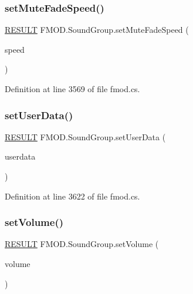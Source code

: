 \subsubsection{\texorpdfstring{set\+Mute\+Fade\+Speed()}{setMuteFadeSpeed()}}
{\footnotesize\ttfamily \hyperlink{namespace_f_m_o_d_a305d1176ef3f8c8815861a60407ac33d}{R\+E\+S\+U\+LT} F\+M\+O\+D.\+Sound\+Group.\+set\+Mute\+Fade\+Speed (\begin{DoxyParamCaption}\item[{float}]{speed }\end{DoxyParamCaption})}



Definition at line 3569 of file fmod.\+cs.

\mbox{\label{class_f_m_o_d_1_1_sound_group_ac73a1233539877dd44a467120e50735b}} 
\subsubsection{\texorpdfstring{set\+User\+Data()}{setUserData()}}
{\footnotesize\ttfamily \hyperlink{namespace_f_m_o_d_a305d1176ef3f8c8815861a60407ac33d}{R\+E\+S\+U\+LT} F\+M\+O\+D.\+Sound\+Group.\+set\+User\+Data (\begin{DoxyParamCaption}\item[{Int\+Ptr}]{userdata }\end{DoxyParamCaption})}



Definition at line 3622 of file fmod.\+cs.

\mbox{\label{class_f_m_o_d_1_1_sound_group_a9c5a0509676c6941fee8566f94aeff48}} 
\subsubsection{\texorpdfstring{set\+Volume()}{setVolume()}}
{\footnotesize\ttfamily \hyperlink{namespace_f_m_o_d_a305d1176ef3f8c8815861a60407ac33d}{R\+E\+S\+U\+LT} F\+M\+O\+D.\+Sound\+Group.\+set\+Volume (\begin{DoxyParamCaption}\item[{float}]{volume }\end{DoxyParamCaption})}



